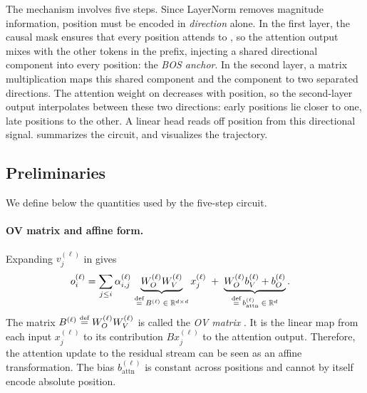 \documentclass{article}
\theoremstyle{plain}
\theoremstyle{definition}
\theoremstyle{remark}
\begin{document}
The mechanism involves five steps.
Since LayerNorm removes magnitude information, position must be
encoded in \emph{direction} alone.
In the first layer, the causal mask ensures that every position
attends to \bos, so the attention output mixes \bos with the other
tokens in the prefix, injecting a shared directional component
into every position: the \emph{BOS anchor}.
In the second layer, a matrix multiplication maps this shared
component and the \nbos component to two separated directions.
The attention weight on \bos decreases with position, so the
second-layer output interpolates between these two directions:
early positions lie closer to one, late positions to the other.
A linear head reads off position from this directional signal.
 summarizes the circuit,
and  visualizes the trajectory.


\subsection{Preliminaries}
\label{subsec:preliminaries}

We define below the quantities used by the five-step circuit.

\paragraph{OV matrix and affine form.}
Expanding $v_j^{(\ell)}$ in  gives
\begin{align}
o_i^{(\ell)}
&= \sum_{j\le i}\alpha_{i,j}^{(\ell)}\,
   \underbrace{W_O^{(\ell)} W_V^{(\ell)}}_{\defeq\, B^{(\ell)}\;\in\;\R^{d\times d}}
   x_j^{(\ell)}
   \;+\; \underbrace{W_O^{(\ell)} b_V^{(\ell)} + b_O^{(\ell)}}_{\defeq\, b_{\text{attn}}^{(\ell)}\;\in\;\R^d}.
\label{eq:attn_affine_ell}
\end{align}
The matrix $B^{(\ell)} \defeq W_O^{(\ell)} W_V^{(\ell)}$ is called the \emph{OV matrix} \citep{elhage2021mathematical}. It is the linear map from each input $x_j^{(\ell)}$ to its contribution $B x_j^{(\ell)}$ to the attention output.
\label{eq:def_B_ell}
Therefore, the attention update to the residual stream can be seen as an affine transformation.
The bias $b_{\text{attn}}^{(\ell)}$ is constant across positions and cannot by itself encode absolute position.
\end{document}

